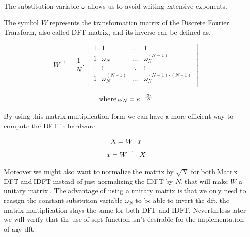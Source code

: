 \documentclass[
  oneside,
  11pt, a4paper,
  footinclude=true,
  headinclude=true,
  cleardoublepage=empty
]{scrbook}
\newcommand{\eqname}[1]{\tag*{#1}}%
\begin{document}
The substitution variable \(\omega\) allows us to avoid writing extensive exponents.

The symbol \(W\) represents the transformation matrix of the Discrete Fourier Transform, also called DFT matrix, and its inverse can be defined as.

\begin{equation*}
    W^{-1} = \frac{1}{N} \cdot
    \begin{bmatrix}
        1      & 1                  & \dots  & 1                              \\
        1      & \omega_{N}         & \dots  & \omega_{N}^{(N-1)}             \\
        \vdots & \vdots             & \ddots & \vdots                         \\
        1      & \omega_{N}^{(N-1)} & \dots  & \omega_{N}^{(N-1) \cdot (N-1)} \\
    \end{bmatrix}
\end{equation*}

\begin{equation*}
    \text{where } \omega_{N} = e^{- \frac{i 2 \pi}{N}} \\
\end{equation*}

By using this matrix multiplication form we can have a more efficient way to compute the DFT in hardware.  

\begin{equation*}
    X = W \cdot x \\ %
\end{equation*}
\begin{equation*}
    x = W^{-1} \cdot X \\ %
\end{equation*}

Moreover we might also want to normalize the matrix by \( \sqrt{N} \) for both Matrix DFT and IDFT instead of just normalizing the IDFT by \(N\), that will make \(W\) a unitary matrix \cite{horn2012matrix}.
The advantage of using a unitary matrix is that we only need to reasign the constant substution variable \(\omega_{N}\) to be able to invert the dft, the matrix multiplication stays the same for both DFT and IDFT. 
Nevertheless later we will verify that the use of sqrt function isn't desirable for the implementation of any dft.
\end{document}
